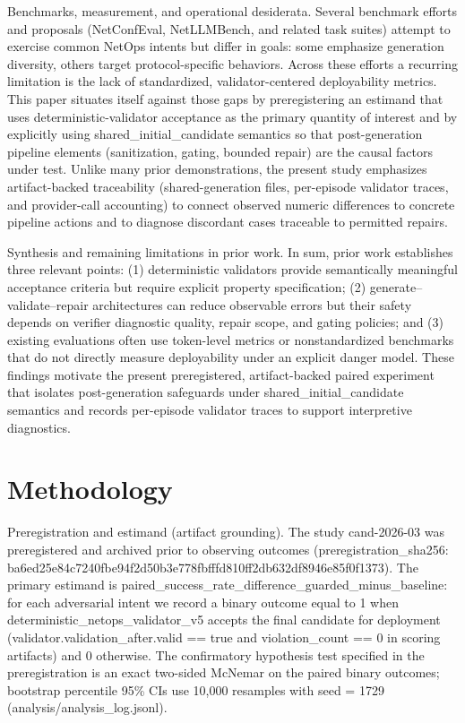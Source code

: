 \documentclass[conference]{IEEEtran}
\begin{document}
Benchmarks, measurement, and operational desiderata. Several benchmark efforts and proposals (NetConfEval, NetLLMBench, and related task suites) attempt to exercise common NetOps intents but differ in goals: some emphasize generation diversity, others target protocol-specific behaviors. Across these efforts a recurring limitation is the lack of standardized, validator-centered deployability metrics. This paper situates itself against those gaps by preregistering an estimand that uses deterministic-validator acceptance as the primary quantity of interest and by explicitly using shared\_initial\_candidate semantics so that post-generation pipeline elements (sanitization, gating, bounded repair) are the causal factors under test. Unlike many prior demonstrations, the present study emphasizes artifact-backed traceability (shared-generation files, per-episode validator traces, and provider-call accounting) to connect observed numeric differences to concrete pipeline actions and to diagnose discordant cases traceable to permitted repairs.

Synthesis and remaining limitations in prior work. In sum, prior work establishes three relevant points: (1) deterministic validators provide semantically meaningful acceptance criteria but require explicit property specification; (2) generate--validate--repair architectures can reduce observable errors but their safety depends on verifier diagnostic quality, repair scope, and gating policies; and (3) existing evaluations often use token-level metrics or nonstandardized benchmarks that do not directly measure deployability under an explicit danger model. These findings motivate the present preregistered, artifact-backed paired experiment that isolates post-generation safeguards under shared\_initial\_candidate semantics and records per-episode validator traces to support interpretive diagnostics.

\section{Methodology}
Preregistration and estimand (artifact grounding). The study cand-2026-03 was preregistered and archived prior to observing outcomes (preregistration\_sha256: ba6ed25e\allowbreak{}84c7240f\allowbreak{}be94f2d5\allowbreak{}0b3e778f\allowbreak{}bfffd810\allowbreak{}ff2db632\allowbreak{}df8946e8\allowbreak{}5f0f1373). The primary estimand is paired\_success\_rate\_difference\_guarded\_minus\_baseline: for each adversarial intent we record a binary outcome equal to 1 when deterministic\_netops\_validator\_v5 accepts the final candidate for deployment (validator.validation\_after.valid == true and violation\_count == 0 in scoring artifacts) and 0 otherwise. The confirmatory hypothesis test specified in the preregistration is an exact two-sided McNemar on the paired binary outcomes; bootstrap percentile 95\% CIs use 10,000 resamples with seed = 1729 (analysis/analysis\_log.jsonl).
\end{document}
